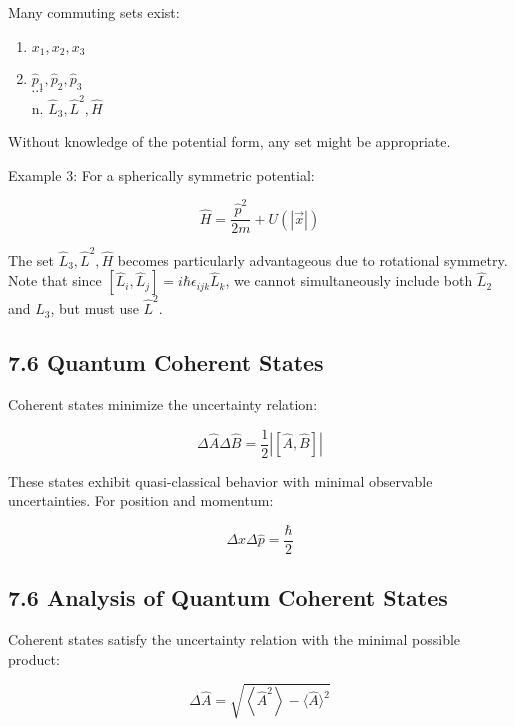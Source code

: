 \documentclass[italian]{HKNdocument}
\begin{document}
Many commuting sets exist:
\begin{enumerate}
  \item $x_{1}, x_{2}, x_{3}$
  \item $\hat{p}_{1}, \hat{p}_{2}, \hat{p}_{3}$\\
$\cdots$\\
n. $\hat{L}_{3}, \hat{L}^{2}, \hat{H}$
\end{enumerate}

Without knowledge of the potential form, any set might be appropriate.

Example 3: For a spherically symmetric potential:

\begin{equation*}
\hat{H}=\frac{\hat{p}^{2}}{2 m}+U(|\vec{x}|) \tag{7.42}
\end{equation*}

The set $\hat{L}_{3}, \hat{L}^{2}, \hat{H}$ becomes particularly advantageous due to rotational symmetry. Note that since $\left[\hat{L}_{i}, \hat{L}_{j}\right]=i \hbar \epsilon_{i j k} \hat{L}_{k}$, we cannot simultaneously include both $\hat{L}_{2}$ and $\hat{L}_{3}$, but must use $\hat{L}^{2}$.

\subsection*{7.6 Quantum Coherent States}
Coherent states minimize the uncertainty relation:

\begin{equation*}
\Delta \hat{A} \Delta \hat{B}=\frac{1}{2}|[\hat{A}, \hat{B}]| \tag{7.43}
\end{equation*}

These states exhibit quasi-classical behavior with minimal observable uncertainties. For position and momentum:

\begin{equation*}
\Delta x \Delta \hat{p}=\frac{\hbar}{2} \tag{7.44}
\end{equation*}


\subsection*{7.6 Analysis of Quantum Coherent States}
Coherent states satisfy the uncertainty relation with the minimal possible product:

\begin{equation*}
\Delta \hat{A}=\sqrt{\left\langle\hat{A}^{2}\right\rangle-\langle\hat{A}\rangle^{2}} \tag{7.45}
\end{equation*}
\end{document}
